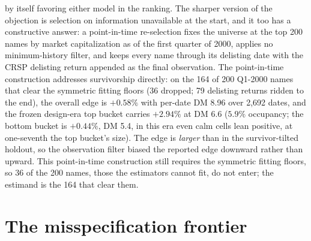 \documentclass[11pt]{article}
\theoremstyle{remark}
\begin{document}
by itself favoring either model in the ranking. The sharper version
of the objection is selection on information unavailable at the
start, and it too has a constructive answer: a point-in-time
re-selection fixes the universe at the top 200 names by market
capitalization as of the first quarter of 2000, applies no
minimum-history filter, and keeps every name through its delisting
date with the CRSP delisting return appended as the final
observation.
The point-in-time construction addresses survivorship directly: on
the 164 of 200 Q1-2000 names that clear the symmetric fitting floors
(36 dropped; 79 delisting returns ridden to the end), the overall
edge is $+0.58\%$ with per-date DM 8.96 over 2{,}692 dates, and the
frozen design-era top bucket carries $+2.94\%$ at DM 6.6 ($5.9\%$
occupancy; the bottom bucket is $+0.44\%$, DM 5.4, in this era even calm cells lean positive, at one-seventh the top bucket's size).
The edge is \emph{larger} than in the survivor-tilted holdout, so the
observation filter biased the reported edge downward rather than
upward. This point-in-time construction still requires the symmetric
fitting floors, so 36 of the 200 names, those the estimators cannot
fit, do not enter; the estimand is the 164 that clear them.

\section{The misspecification frontier}\label{sec:frontier}
\end{document}
